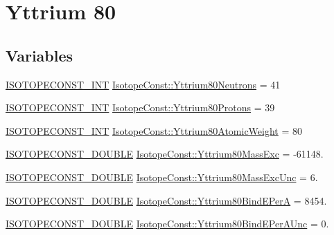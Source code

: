 \hypertarget{group___isotope_const-_yttrium-_y80}{}\section{Yttrium 80}
\label{group___isotope_const-_yttrium-_y80}
\subsection*{Variables}
\begin{DoxyCompactItemize}
\item 
\mbox{\hyperlink{group___isotope_const-_macros_ga5f18360b3e99483a35c32d789e62621c}{I\+S\+O\+T\+O\+P\+E\+C\+O\+N\+S\+T\+\_\+\+I\+NT}} \mbox{\hyperlink{group___isotope_const-_yttrium-_y80_ga3325c1091bcb48bfdb8569aaf56183f7}{Isotope\+Const\+::\+Yttrium80\+Neutrons}} = 41
\item 
\mbox{\hyperlink{group___isotope_const-_macros_ga5f18360b3e99483a35c32d789e62621c}{I\+S\+O\+T\+O\+P\+E\+C\+O\+N\+S\+T\+\_\+\+I\+NT}} \mbox{\hyperlink{group___isotope_const-_yttrium-_y80_ga3763ab366b49087d4174b68f8b874260}{Isotope\+Const\+::\+Yttrium80\+Protons}} = 39
\item 
\mbox{\hyperlink{group___isotope_const-_macros_ga5f18360b3e99483a35c32d789e62621c}{I\+S\+O\+T\+O\+P\+E\+C\+O\+N\+S\+T\+\_\+\+I\+NT}} \mbox{\hyperlink{group___isotope_const-_yttrium-_y80_ga7d45bf0c59f3a20a8d1017257114e2d4}{Isotope\+Const\+::\+Yttrium80\+Atomic\+Weight}} = 80
\item 
\mbox{\hyperlink{group___isotope_const-_macros_ga8f45a7272ce02c0b4c65c44636ed719a}{I\+S\+O\+T\+O\+P\+E\+C\+O\+N\+S\+T\+\_\+\+D\+O\+U\+B\+LE}} \mbox{\hyperlink{group___isotope_const-_yttrium-_y80_gab3d73a8ded614dbc182e3bddb8b9ed02}{Isotope\+Const\+::\+Yttrium80\+Mass\+Exc}} = -\/61148.
\item 
\mbox{\hyperlink{group___isotope_const-_macros_ga8f45a7272ce02c0b4c65c44636ed719a}{I\+S\+O\+T\+O\+P\+E\+C\+O\+N\+S\+T\+\_\+\+D\+O\+U\+B\+LE}} \mbox{\hyperlink{group___isotope_const-_yttrium-_y80_ga5ce03f6b0ca55399b52eeee460dc6d7f}{Isotope\+Const\+::\+Yttrium80\+Mass\+Exc\+Unc}} = 6.
\item 
\mbox{\hyperlink{group___isotope_const-_macros_ga8f45a7272ce02c0b4c65c44636ed719a}{I\+S\+O\+T\+O\+P\+E\+C\+O\+N\+S\+T\+\_\+\+D\+O\+U\+B\+LE}} \mbox{\hyperlink{group___isotope_const-_yttrium-_y80_ga0379bccaffab110b86a3113273a56277}{Isotope\+Const\+::\+Yttrium80\+Bind\+E\+PerA}} = 8454.
\item 
\mbox{\hyperlink{group___isotope_const-_macros_ga8f45a7272ce02c0b4c65c44636ed719a}{I\+S\+O\+T\+O\+P\+E\+C\+O\+N\+S\+T\+\_\+\+D\+O\+U\+B\+LE}} \mbox{\hyperlink{group___isotope_const-_yttrium-_y80_gac381a9239bf742ced68e375541e58fae}{Isotope\+Const\+::\+Yttrium80\+Bind\+E\+Per\+A\+Unc}} = 0.

\end{DoxyCompactItemize}
